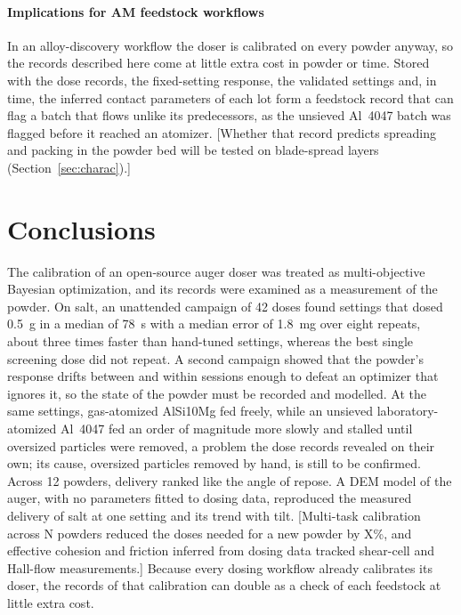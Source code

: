 \documentclass[preprint,12pt]{elsarticle}
\newcommand{\ph}[1]{\textcolor{orange!75!black}{\textsf{[#1]}}}
\begin{document}
\paragraph{Implications for AM feedstock workflows} In an alloy-discovery workflow the doser is calibrated on every powder anyway, so the records described here come at little extra cost in powder or time. Stored with the dose records, the fixed-setting response, the validated settings and, in time, the inferred contact parameters of each lot form a feedstock record that can flag a batch that flows unlike its predecessors, as the unsieved Al~4047 batch was flagged before it reached an atomizer. \ph{Whether that record predicts spreading and packing in the powder bed will be tested on blade-spread layers (Section~\ref{sec:charac}).}

\section{Conclusions}
\label{sec:conclusions}

The calibration of an open-source auger doser was treated as multi-objective Bayesian optimization, and its records were examined as a measurement of the powder. On salt, an unattended campaign of 42 doses found settings that dosed 0.5~g in a median of 78~s with a median error of 1.8~mg over eight repeats, about three times faster than hand-tuned settings, whereas the best single screening dose did not repeat. A second campaign showed that the powder's response drifts between and within sessions enough to defeat an optimizer that ignores it, so the state of the powder must be recorded and modelled. At the same settings, gas-atomized AlSi10Mg fed freely, while an unsieved laboratory-atomized Al~4047 fed an order of magnitude more slowly and stalled until oversized particles were removed, a problem the dose records revealed on their own; its cause, oversized particles removed by hand, is still to be confirmed. Across 12 powders, delivery ranked like the angle of repose. A DEM model of the auger, with no parameters fitted to dosing data, reproduced the measured delivery of salt at one setting and its trend with tilt. \ph{Multi-task calibration across N powders reduced the doses needed for a new powder by X\%, and effective cohesion and friction inferred from dosing data tracked shear-cell and Hall-flow measurements.} Because every dosing workflow already calibrates its doser, the records of that calibration can double as a check of each feedstock at little extra cost.
\end{document}
